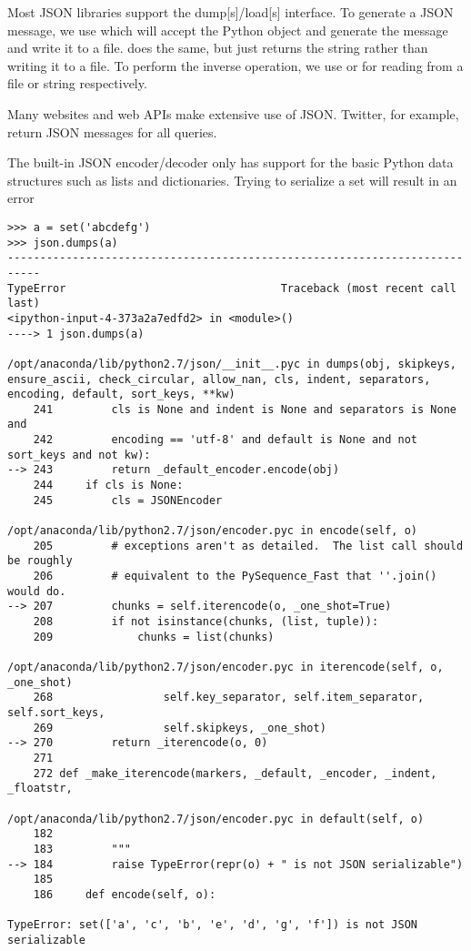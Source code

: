 Most JSON libraries support the dump[s]/load[s] interface.
To generate a JSON message, we use  which will accept the Python object and generate the message and write it to a file.
 does the same, but just returns the string rather than writing it to a file.
To perform the inverse operation, we use  or  for reading from a file or string respectively.

Many websites and web APIs make extensive use of JSON.
Twitter, for example, return JSON messages for all queries.

The built-in JSON encoder/decoder only has support for the basic Python data structures such as lists and dictionaries.
Trying to serialize a set will result in an error
\begin{lstlisting}
>>> a = set('abcdefg')
>>> json.dumps(a)
---------------------------------------------------------------------------
TypeError                                 Traceback (most recent call last)
<ipython-input-4-373a2a7edfd2> in <module>()
----> 1 json.dumps(a)

/opt/anaconda/lib/python2.7/json/__init__.pyc in dumps(obj, skipkeys, ensure_ascii, check_circular, allow_nan, cls, indent, separators, encoding, default, sort_keys, **kw)
    241         cls is None and indent is None and separators is None and
    242         encoding == 'utf-8' and default is None and not sort_keys and not kw):
--> 243         return _default_encoder.encode(obj)
    244     if cls is None:
    245         cls = JSONEncoder

/opt/anaconda/lib/python2.7/json/encoder.pyc in encode(self, o)
    205         # exceptions aren't as detailed.  The list call should be roughly
    206         # equivalent to the PySequence_Fast that ''.join() would do.
--> 207         chunks = self.iterencode(o, _one_shot=True)
    208         if not isinstance(chunks, (list, tuple)):
    209             chunks = list(chunks)

/opt/anaconda/lib/python2.7/json/encoder.pyc in iterencode(self, o, _one_shot)
    268                 self.key_separator, self.item_separator, self.sort_keys,
    269                 self.skipkeys, _one_shot)
--> 270         return _iterencode(o, 0)
    271 
    272 def _make_iterencode(markers, _default, _encoder, _indent, _floatstr,

/opt/anaconda/lib/python2.7/json/encoder.pyc in default(self, o)
    182 
    183         """
--> 184         raise TypeError(repr(o) + " is not JSON serializable")
    185 
    186     def encode(self, o):

TypeError: set(['a', 'c', 'b', 'e', 'd', 'g', 'f']) is not JSON serializable
\end{lstlisting}
